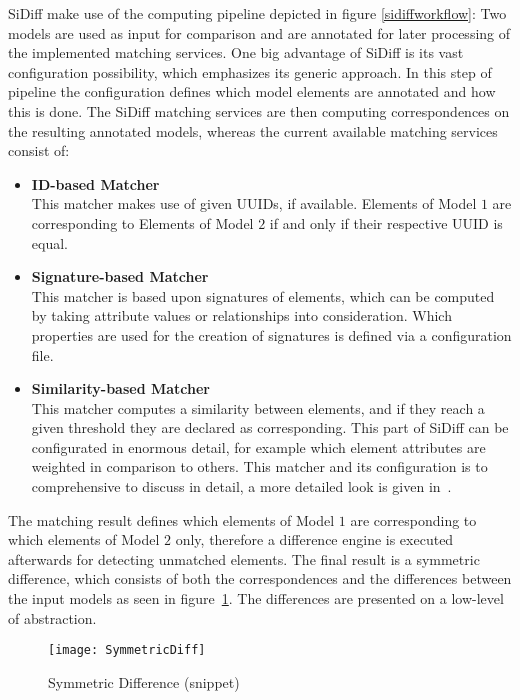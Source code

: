 SiDiff make use of the computing pipeline depicted in figure
\ref{sidiffworkflow}: Two models are used as input for comparison and are
annotated for later processing of the implemented matching services. One big
advantage of SiDiff is its vast configuration possibility, which emphasizes
its generic approach. In this step of pipeline the configuration defines which
model elements are annotated and how this is done. The SiDiff matching services
are then computing correspondences on the resulting annotated
models, whereas the current available matching services consist of:
\begin{itemize}
  \item  \textbf{ID-based Matcher} \\
  		This matcher makes use of given \ac{UUID}s, if available. Elements of Model
  		$1$ are corresponding to Elements of Model $2$ if and only if their
  		respective \ac{UUID} is equal.
  \item  \textbf{Signature-based Matcher} \\
  	 	This matcher is based upon signatures of elements, which can be computed by
  	 	taking attribute values or relationships into consideration. Which
  	 	properties are used for the creation of signatures is defined via a
  	 	configuration file.
  \item  \textbf{Similarity-based Matcher} \\
  		This matcher computes a similarity between elements, and if they reach a
  		given threshold they are declared as corresponding. This part of SiDiff
  		can be configurated in enormous detail, for example which element attributes
  		are weighted in comparison to others. This matcher and its
  		configuration is to comprehensive to discuss in detail, a more
  		detailed look is given in~\cite{KellerWN05}.
\end{itemize}
The matching result defines which elements of Model $1$ are  corresponding to
which elements of Model $2$ only, therefore a difference engine is executed
afterwards for detecting unmatched elements. The final result is a 
symmetric difference, which consists of both the correspondences and the differences 
between the input models as seen in figure~\ref{symmetricdiff}. The differences
are presented on a low-level of abstraction.

\begin{figure}[h!]
\begin{center}
\texttt{[image: SymmetricDiff]}\\
\end{center}
\caption{Symmetric Difference (snippet)~\cite{SiDiffURL}}
\label{symmetricdiff}
\end{figure}

